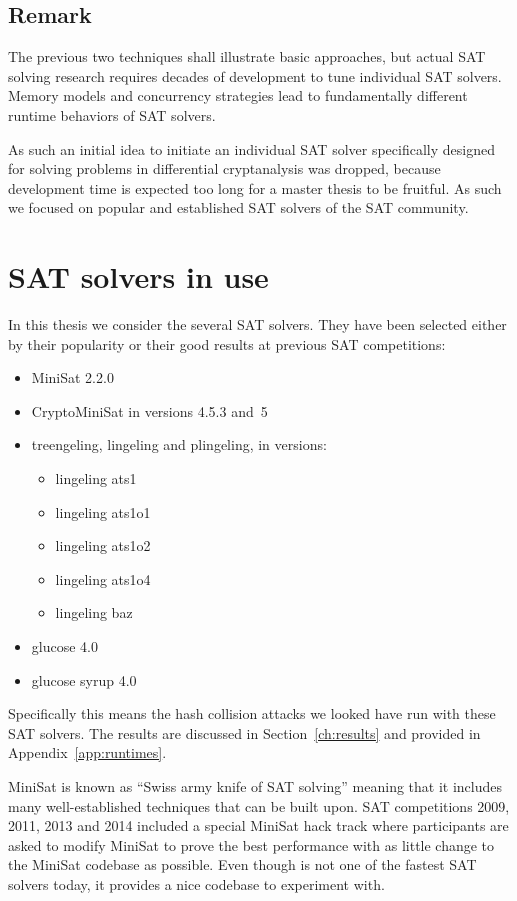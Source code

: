 \subsection{Remark}
\label{sec:sat-remark}
%
The previous two techniques shall illustrate basic approaches, but actual SAT
solving research requires decades of development to tune individual SAT solvers.
Memory models and concurrency strategies lead to fundamentally different runtime
behaviors of SAT solvers.

As such an initial idea to initiate an individual SAT solver specifically designed for
solving problems in differential cryptanalysis was dropped, because development time
is expected too long for a master thesis to be fruitful. As such we focused on popular
and established SAT solvers of the SAT community.

\section{SAT solvers in use}
\label{sec:sat-solvers}
%
In this thesis we consider the several SAT solvers.
They have been selected either by their popularity
or their good results at previous SAT competitions:
\begin{itemize}
  \item MiniSat 2.2.0
  \item CryptoMiniSat in versions 4.5.3 and~5
  \item treengeling, lingeling and plingeling, in versions:
    \begin{itemize}
      \item lingeling ats1
      \item lingeling ats1o1
      \item lingeling ats1o2
      \item lingeling ats1o4
      \item lingeling baz
    \end{itemize}
  \item glucose 4.0
  \item glucose syrup 4.0
\end{itemize}

Specifically this means the hash collision attacks we looked have run with
these SAT solvers. The results are discussed in Section~\ref{ch:results}
and provided in Appendix~\ref{app:runtimes}.

MiniSat is known as \enquote{Swiss army knife of SAT solving} meaning that
it includes many well-established techniques that can be built upon.
SAT competitions 2009, 2011, 2013 and 2014 included a special MiniSat
hack track where participants are asked to modify MiniSat to prove the
best performance with as little change to the MiniSat codebase as possible.
Even though is not one of the fastest SAT solvers today, it provides
a nice codebase to experiment with.

